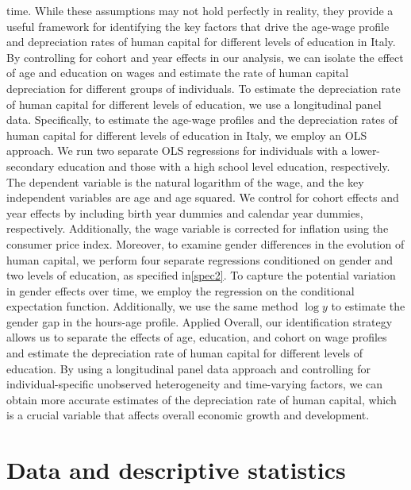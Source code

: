 \documentclass[12pt]{article}
\begin{document}
time.\newline
While these assumptions may not hold perfectly in reality, they provide a useful framework for identifying the key
factors that drive the age-wage profile and depreciation rates of human capital for different levels of education in
Italy. By controlling for cohort and year effects in our analysis, we can isolate the effect of age and education on
wages and estimate the rate of human capital depreciation for different groups of individuals.
\newline
To estimate the depreciation rate of human capital for different levels of education, we use a longitudinal panel data.
Specifically, to estimate the age-wage profiles and the depreciation rates of human capital for different levels of
education in Italy, we employ an OLS approach. We run two separate OLS regressions for individuals with a
lower-secondary education and those with a high school level education, respectively. The dependent variable is the
natural logarithm of the wage, and the key independent variables are age and age squared. We control for cohort effects
and year effects by including birth year dummies and calendar year dummies, respectively. Additionally, the wage
variable is corrected for inflation using the consumer price index.
\newline
Moreover, to examine gender differences in the evolution of human capital, we perform four separate regressions
conditioned on gender and two levels of education, as specified in\ref{spec2}. To capture the potential variation in
gender effects over time, we employ the regression on the conditional expectation function. Additionally, we use the
same method $\log{y}$ to estimate the gender gap in the hours-age profile.
\newline
 Applied Overall, our identification strategy allows us to separate the effects of age, education, and cohort on wage
 profiles and estimate the depreciation rate of human capital for different levels of education. By using a longitudinal
 panel data approach and controlling for individual-specific unobserved heterogeneity and time-varying factors, we can
 obtain more accurate estimates of the depreciation rate of human capital, which is a crucial variable that affects
 overall economic growth and development.
\section{Data and descriptive statistics}
\end{document}
